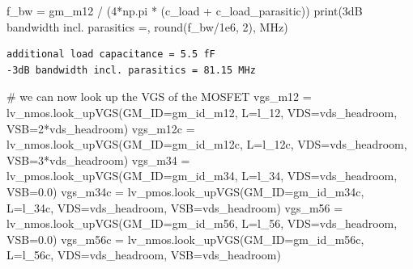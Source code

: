 \documentclass[
  a4paper,
  DIV=11,
  numbers=noendperiod]{scrartcl}
\newenvironment{Shaded}{\begin{snugshade}}{\end{snugshade}}
\newcommand{\BuiltInTok}[1]{\textcolor[rgb]{0.00,0.23,0.31}{#1}}
\newcommand{\CommentTok}[1]{\textcolor[rgb]{0.37,0.37,0.37}{#1}}
\newcommand{\DecValTok}[1]{\textcolor[rgb]{0.68,0.00,0.00}{#1}}
\newcommand{\FloatTok}[1]{\textcolor[rgb]{0.68,0.00,0.00}{#1}}
\newcommand{\NormalTok}[1]{\textcolor[rgb]{0.00,0.23,0.31}{#1}}
\newcommand{\OperatorTok}[1]{\textcolor[rgb]{0.37,0.37,0.37}{#1}}
\newcommand{\StringTok}[1]{\textcolor[rgb]{0.13,0.47,0.30}{#1}}
\begin{document}
\begin{tcolorbox}
\begin{Shaded}
\begin{Highlighting}[]
\NormalTok{f\_bw }\OperatorTok{=}\NormalTok{ gm\_m12 }\OperatorTok{/}\NormalTok{ (}\DecValTok{4}\OperatorTok{*}\NormalTok{np.pi }\OperatorTok{*}\NormalTok{ (c\_load }\OperatorTok{+}\NormalTok{ c\_load\_parasitic))}
\BuiltInTok{print}\NormalTok{(}\StringTok{\textquotesingle{}{-}3dB bandwidth incl. parasitics =\textquotesingle{}}\NormalTok{, }\BuiltInTok{round}\NormalTok{(f\_bw}\OperatorTok{/}\FloatTok{1e6}\NormalTok{, }\DecValTok{2}\NormalTok{), }\StringTok{\textquotesingle{}MHz\textquotesingle{}}\NormalTok{)}
\end{Highlighting}
\end{Shaded}

\begin{verbatim}
additional load capacitance = 5.5 fF
-3dB bandwidth incl. parasitics = 81.15 MHz
\end{verbatim}

\begin{Shaded}
\begin{Highlighting}[]
\CommentTok{\# we can now look up the VGS of the MOSFET}
\NormalTok{vgs\_m12 }\OperatorTok{=}\NormalTok{ lv\_nmos.look\_upVGS(GM\_ID}\OperatorTok{=}\NormalTok{gm\_id\_m12, L}\OperatorTok{=}\NormalTok{l\_12, VDS}\OperatorTok{=}\NormalTok{vds\_headroom, VSB}\OperatorTok{=}\DecValTok{2}\OperatorTok{*}\NormalTok{vds\_headroom)}
\NormalTok{vgs\_m12c }\OperatorTok{=}\NormalTok{ lv\_nmos.look\_upVGS(GM\_ID}\OperatorTok{=}\NormalTok{gm\_id\_m12c, L}\OperatorTok{=}\NormalTok{l\_12c, VDS}\OperatorTok{=}\NormalTok{vds\_headroom, VSB}\OperatorTok{=}\DecValTok{3}\OperatorTok{*}\NormalTok{vds\_headroom)}
\NormalTok{vgs\_m34 }\OperatorTok{=}\NormalTok{ lv\_pmos.look\_upVGS(GM\_ID}\OperatorTok{=}\NormalTok{gm\_id\_m34, L}\OperatorTok{=}\NormalTok{l\_34, VDS}\OperatorTok{=}\NormalTok{vds\_headroom, VSB}\OperatorTok{=}\FloatTok{0.0}\NormalTok{) }
\NormalTok{vgs\_m34c }\OperatorTok{=}\NormalTok{ lv\_pmos.look\_upVGS(GM\_ID}\OperatorTok{=}\NormalTok{gm\_id\_m34c, L}\OperatorTok{=}\NormalTok{l\_34c, VDS}\OperatorTok{=}\NormalTok{vds\_headroom, VSB}\OperatorTok{=}\NormalTok{vds\_headroom) }
\NormalTok{vgs\_m56 }\OperatorTok{=}\NormalTok{ lv\_nmos.look\_upVGS(GM\_ID}\OperatorTok{=}\NormalTok{gm\_id\_m56, L}\OperatorTok{=}\NormalTok{l\_56, VDS}\OperatorTok{=}\NormalTok{vds\_headroom, VSB}\OperatorTok{=}\FloatTok{0.0}\NormalTok{) }
\NormalTok{vgs\_m56c }\OperatorTok{=}\NormalTok{ lv\_nmos.look\_upVGS(GM\_ID}\OperatorTok{=}\NormalTok{gm\_id\_m56c, L}\OperatorTok{=}\NormalTok{l\_56c, VDS}\OperatorTok{=}\NormalTok{vds\_headroom, VSB}\OperatorTok{=}\NormalTok{vds\_headroom) }


\end{Highlighting}
\end{Shaded}
\end{tcolorbox}
\end{document}
